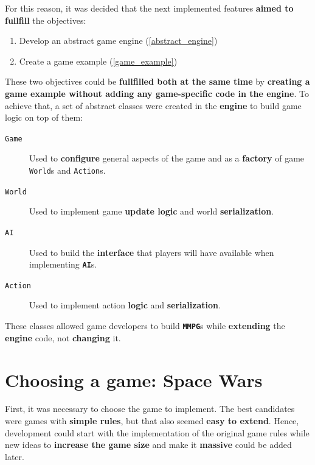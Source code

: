 \documentclass[a4paper,11pt,titlepage,abstract,numbers=noenddot,automark,mnsy,intlimits,rgb,dvipsnames]{report}
\begin{document}
For this reason, it was decided that the next implemented features \textbf{aimed to fullfill} the objectives:
\begin{enumerate}
\item
Develop an abstract game engine (\autoref{abstract_engine})
\item
Create a game example (\autoref{game_example})
\end{enumerate}
These two objectives could be \textbf{fullfilled both at the same time} by \textbf{creating a game example without adding any game-specific
code in the engine}. To achieve that, a set of abstract classes were created in the \textbf{engine} to build game logic on top of them:
\begin{description}
\item[\texttt{Game}]
Used to \textbf{configure} general aspects of the game and as a \textbf{factory} of game \texttt{World}s and \texttt{Action}s.
\item[\texttt{World}]
Used to implement game \textbf{update logic} and world \textbf{serialization}.
\item[\texttt{AI}]
Used to build the \textbf{interface} that players will have available when implementing \textbf{\texttt{AI}}s.
\item[\texttt{Action}]
Used to implement action \textbf{logic} and \textbf{serialization}.
\end{description}
These classes allowed game developers to build \textbf{\texttt{MMPG}}s while \textbf{extending} the \textbf{engine} code, not \textbf{changing} it.
\section{Choosing a game: Space Wars}
First, it was necessary to choose the game to implement. The best candidates were games with \textbf{simple rules}, but that
also seemed \textbf{easy to extend}. Hence, development could start with the implementation of the original game rules while
new ideas to \textbf{increase the game size} and make it \textbf{massive} could be added later.
\end{document}
